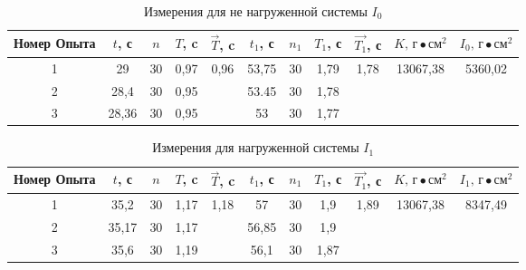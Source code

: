 \begin{table}
    \centering

    \begin{tabular}{|c|c|c|c|c|c|c|c|c|c|c|}
        \hline
        Номер Опыта & $t$, с & $n$ & $T$, c &  $\vec{T}$, c       & $t_1$, с & $n_1$ & $T_1$, с & $\vec{T_1}$, с        & $K \text{, г}\bullet\text{см}^2$ & $I_0\text{, г}\bullet\text{см}^2$ \\
        \hline
                  1 & 29     & 30  & 0,97   &\multirow{3}{*}{0,96}& 53,75    &  30   & 1,79     & \multirow{3}{*}{1,78} & \multirow{1}{*}{13067,38}        & \multirow{3}{*}{5360,02}          \\
        \hline
                  2 & 28,4   & 30  & 0,95   &                     & 53.45    &  30   & 1,78     &                       &                                  &                                   \\
        \hline
                  3 & 28,36  & 30  & 0,95   &                     & 53       &  30   & 1,77     &                       &                                  &                                   \\
        \hline
    \end{tabular}

    \caption{Измерения для не нагруженной системы $I_0$} \label{table-1}
\end{table}

\begin{table}
    \centering
    
    \begin{tabular}{|c|c|c|c|c|c|c|c|c|c|c|}
        \hline
        Номер Опыта & $t$, с & $n$ & $T$, c &     $\vec{T}$, c      & $t_1$, с & $n_1$ & $T_1$, с & $\vec{T_1}$, с         & $K \text{, г}\bullet\text{см}^2$ & $I_1\text{, г}\bullet\text{см}^2$ \\
        \hline
                  1 &  35,2  & 30  &  1,17  & \multirow{3}{*}{1,18} &   57     &  30   &  1,9     & \multirow{3}{*}{1,89}  &     \multirow{3}{*}{13067,38 }   & \multirow{3}{*}{8347,49}          \\
        \hline
                  2 &  35,17 & 30  &  1,17  &                       &   56,85  &  30   &  1,9     &                        &                                  &                                   \\
        \hline
                  3 &  35,6  & 30  &  1,19  &                       &   56,1   &  30   &  1,87    &                        &                                  &                                   \\
        \hline
    \end{tabular}

    \caption{Измерения для нагруженной системы $I_1$} \label{table-2}
\end{table}

